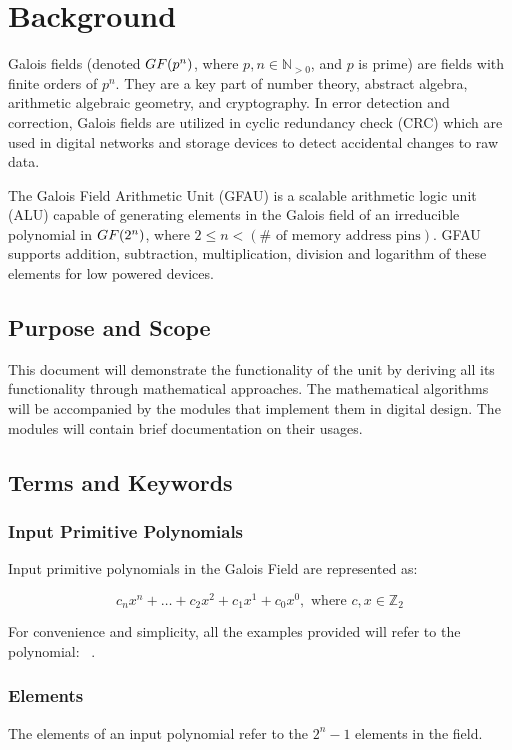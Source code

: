 \section{Background} Galois fields (denoted $GF(p^n)$, where $p,n \in
\mathbb{N}_{>0}$, and $p$ is prime) are fields with finite orders of $p^n$.
They are a key part of number theory, abstract algebra, arithmetic algebraic
geometry, and cryptography. In error detection and correction, Galois fields
are utilized in cyclic redundancy check (CRC) which are used in digital
networks and storage devices to detect accidental changes to raw data.

The Galois Field Arithmetic Unit (GFAU) is a scalable arithmetic logic unit
(ALU) capable of generating elements in the Galois field of an irreducible
polynomial in $GF(2^n)$, where $2 \leq n < (\text{$\#$ of memory address
pins})$. GFAU supports addition, subtraction, multiplication, division and
logarithm of these elements for low powered devices.

    \subsection{Purpose and Scope} This document will demonstrate the
    functionality of the unit by deriving all its functionality through
    mathematical approaches. The mathematical algorithms will be accompanied by
    the modules that implement them in digital design. The modules will contain
    brief documentation on their usages.

    \subsection{Terms and Keywords}

        \subsubsection{Input Primitive Polynomials} Input primitive
        polynomials in the Galois Field are represented as:

        \[ c_{n}x^{n}+\ldots+c_{2}x^{2}+c_{1}x^{1}+c_{0}x^{0}, \text{ where }
        c,x \in \mathbb{Z}_2 \]

        For convenience and simplicity, all the examples provided will refer to
        the polynomial: \examplepoly~.

        \subsubsection{Elements} The elements of an input polynomial refer
        to the $2^{n}-1$ elements in the field.

